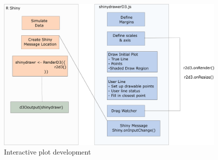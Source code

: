 \documentclass[print]{nuthesis}
\begin{document}
\begin{figure}[tbp]

{\centering \includegraphics[width=0.8\linewidth,]{images/r2d3+shiny-inkscape} 

}

\caption{Interactive plot development}\label{fig:r2d3-shiny-flowchart}
\end{figure}
\end{document}
